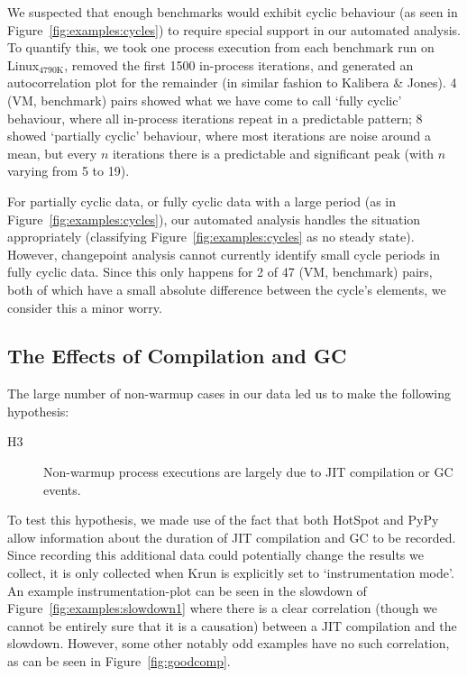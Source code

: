 \documentclass[preprint,numbers,10pt]{sigplanconf}
\newcommand{\kalibera}{Kalibera \& Jones\xspace}
\newcommand{\krun}{Krun\xspace}
\newcommand{\bencherthree}{Linux$_\mathrm{4790K}$\xspace}
\begin{document}
We suspected that enough benchmarks
would exhibit cyclic behaviour (as seen in Figure~\ref{fig:examples:cycles}) to
require special support in our automated analysis. To quantify this, we took one process
execution from each benchmark run on \bencherthree, removed the first 1500
in-process iterations, and generated an autocorrelation plot for the remainder
(in similar fashion to \kalibera). 4 (VM, benchmark) pairs showed what we have come to
call `fully cyclic' behaviour, where all in-process iterations repeat in a
predictable pattern; 8 showed `partially cyclic' behaviour, where
most iterations are noise around a mean, but every $n$ iterations there is a
predictable and significant peak (with $n$ varying from 5 to 19).

For partially cyclic data, or fully cyclic data with a large period (as in
Figure~\ref{fig:examples:cycles}), our automated analysis handles the situation
appropriately (classifying Figure~\ref{fig:examples:cycles} as no steady state).
However, changepoint analysis cannot currently identify small cycle periods in
fully cyclic data. Since this only happens for 2
of 47 (VM, benchmark) pairs, both of which have a small absolute difference between the
cycle's elements, we consider this a minor worry.


\subsection{The Effects of Compilation and GC}
\label{sec:deepdive}

The large number of non-warmup cases in our data led us to make the following hypothesis:
\begin{description}
  \item[H3] Non-warmup process executions are largely due to JIT compilation or GC events.
\end{description}
To test this hypothesis, we made use of the fact that both HotSpot and PyPy allow
information about the duration of JIT compilation and GC to be recorded. Since
recording this additional data could potentially change the results we collect,
it is only collected when \krun is explicitly set to `instrumentation mode'. An
example instrumentation-plot can be seen in the slowdown of
Figure~\ref{fig:examples:slowdown1} where there is a clear correlation (though we
cannot be entirely sure that it is a causation) between a JIT compilation and
the slowdown. However, some other notably odd examples have no such correlation,
as can be seen in Figure~\ref{fig:goodcomp}.
\end{document}
